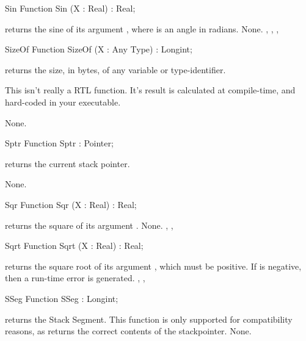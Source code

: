 \documentclass{report}
\begin{document}
\begin{function}{Sin}
\Declaration
Function Sin (X : Real) : Real;

\Description
{} returns the sine of its argument , where  is an
angle in radians.
\Errors
None.
\SeeAlso
{}, , , 
\end{function}


\begin{function}{SizeOf}
\Declaration
Function SizeOf (X : Any Type) : Longint;

\Description
{} returns the size, in bytes, of any variable or type-identifier.
\begin{remark} 
This isn't really a RTL function. It's result is calculated at
compile-time, and hard-coded in your executable.
\end{remark}
\Errors
None.
\SeeAlso
{}
\end{function}


\begin{function}{Sptr}
\Declaration
Function Sptr  : Pointer;

\Description
{} returns the current stack pointer.

\Errors
None.
\SeeAlso
{}
\end{function}


\begin{function}{Sqr}
\Declaration
Function Sqr (X : Real) : Real;

\Description
{} returns the square of its argument .
\Errors
None.
\SeeAlso
{}, , 
\end{function}


\begin{function}{Sqrt}
\Declaration
Function Sqrt (X : Real) : Real;

\Description
{} returns the square root of its argument , which must be
positive.
\Errors
If  is negative, then a run-time error is generated.
\SeeAlso
{}, , 
\end{function}


\begin{function}{SSeg}
\Declaration
Function SSeg  : Longint;

\Description
  returns the Stack Segment. This function is only
 supported for compatibility reasons, as  returns the
correct contents of the stackpointer.
\Errors
None.
\SeeAlso
{}
\end{function}
\end{document}
